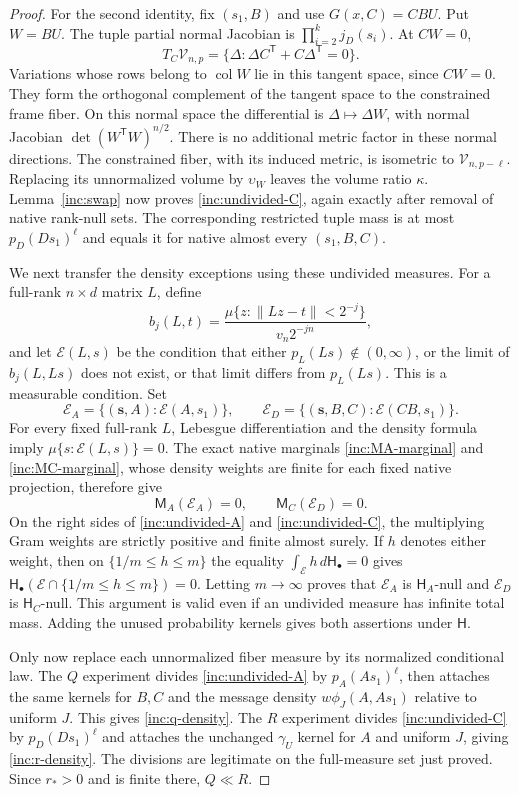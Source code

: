 \begin{proof}
For the second identity, fix \((s_1,B)\) and use
\(G(x,C)=CBU\).  Put \(W=BU\).  The tuple partial normal Jacobian is
\(\prod_{i=2}^k j_D(s_i)\).  At \(CW=0\),
\[
 T_C\mathcal V_{n,p}
 =\{\Delta:\Delta C^{\mathsf T}+C\Delta^{\mathsf T}=0\}.
\]
Variations whose rows belong to \(\operatorname{col}W\) lie in this
tangent space, since \(C W=0\).  They form the orthogonal complement
of the tangent space to the constrained frame fiber.  On this normal
space the differential is \(\Delta\mapsto\Delta W\), with normal
Jacobian
\(\det(W^{\mathsf T}W)^{n/2}\).  There is no additional metric factor
in these normal directions.  The constrained fiber, with its induced
metric, is isometric to \(\mathcal V_{n,p-\ell}\).  Replacing its
unnormalized volume by \(\upsilon_W\) leaves the volume ratio \(\kappa\).
Lemma~\ref{inc:swap} now proves \eqref{inc:undivided-C}, again exactly
after removal of native rank-null sets.  The corresponding restricted
tuple mass is at most \(p_D(Ds_1)^\ell\) and equals it for native almost
every \((s_1,B,C)\).

We next transfer the density exceptions using these undivided measures.
For a full-rank \(n\times d\) matrix \(L\), define
\[
 b_j(L,t)=
 \frac{\mu\{z:\|Lz-t\|<2^{-j}\}}{v_n2^{-jn}},
\]
and let \(\mathcal E(L,s)\) be the condition that either
\(p_L(Ls)\notin(0,\infty)\), or the limit of \(b_j(L,Ls)\) does not
exist, or that limit differs from \(p_L(Ls)\).  This is a measurable
condition.  Set
\[
 \mathcal E_A=\{(\mathbf s,A):\mathcal E(A,s_1)\},\qquad
 \mathcal E_D=\{(\mathbf s,B,C):\mathcal E(CB,s_1)\}.
\]
For every fixed full-rank \(L\), Lebesgue differentiation and the
density formula imply \(\mu\{s:\mathcal E(L,s)\}=0\).
The exact native marginals \eqref{inc:MA-marginal} and
\eqref{inc:MC-marginal}, whose density weights are finite for each
fixed native projection, therefore give
\[
 \mathsf M_A(\mathcal E_A)=0,\qquad
 \mathsf M_C(\mathcal E_D)=0.
\]
On the right sides of \eqref{inc:undivided-A} and
\eqref{inc:undivided-C}, the multiplying Gram weights are strictly
positive and finite almost surely.  If \(h\) denotes either weight,
then on \(\{1/m\le h\le m\}\) the equality
\(\int_{\mathcal E}h\,d\mathsf H_\bullet=0\) gives
\(\mathsf H_\bullet(\mathcal E\cap\{1/m\le h\le m\})=0\).
Letting \(m\to\infty\) proves that \(\mathcal E_A\) is
\(\mathsf H_A\)-null and \(\mathcal E_D\) is \(\mathsf H_C\)-null.
This argument is valid even if an undivided measure has infinite total
mass.  Adding the unused probability kernels gives both assertions
under \(\mathsf H\).

Only now replace each unnormalized fiber measure by its normalized
conditional law.  The \(Q\) experiment divides
\eqref{inc:undivided-A} by \(p_A(As_1)^\ell\), then attaches the same
kernels for \(B,C\) and the message density \(w\phi_J(A,As_1)\) relative
to uniform \(J\).  This gives \eqref{inc:q-density}.  The \(R\)
experiment divides \eqref{inc:undivided-C} by \(p_D(Ds_1)^\ell\) and
attaches the unchanged \(\gamma_U\) kernel for \(A\) and uniform \(J\),
giving \eqref{inc:r-density}.  The divisions are legitimate on the
full-measure set just proved.  Since \(r_*>0\) and is finite there,
\(Q\ll R\).
\end{proof}

